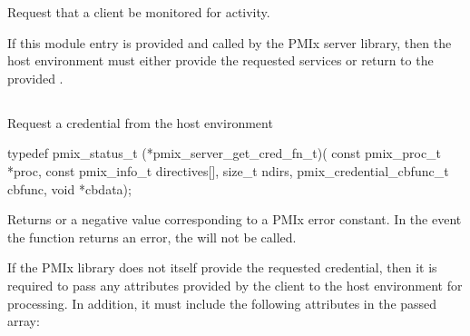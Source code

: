 \optattrend

\descr

Request that a client be monitored for activity.

\advicermstart
If this module entry is provided and called by the \ac{PMIx} server library, then the host environment must either provide the requested services or return  to the provided .
\advicermend

\subsection{}

\summary

Request a credential from the host environment

\format

\cspecificstart
\begin{codepar}
typedef pmix_status_t (*pmix_server_get_cred_fn_t)(
                             const pmix_proc_t *proc,
                             const pmix_info_t directives[],
                             size_t ndirs,
                             pmix_credential_cbfunc_t cbfunc,
                             void *cbdata);
\end{codepar}
\cspecificend

\begin{arglist}
\end{arglist}

Returns  or a negative value corresponding to a PMIx error constant. In the event the function returns an error, the  will not be called.

\reqattrstart
If the \ac{PMIx} library does not itself provide the requested credential, then it is required to pass any attributes provided by the client to the host environment for processing. In addition, it must include the following attributes in the passed  array:

